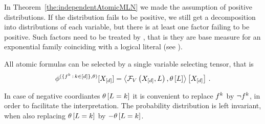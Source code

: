 
In Theorem~\ref{the:independentAtomicMLN} we made the assumption of positive distributions.
If the distribution fails to be positive, we still get a decomposition into distributions of each variable, but there is at least one factor failing to be positive.
Such factors need to be treated by \HybridLogicNetworks{}, that is they are base measure for an exponential family coinciding with a logical literal (see ).

All atomic formulas can be selected by a single variable selecting tensor, that is
\[ \phi^{(\{f^{k} \,:\, k\in[d]\},\theta)}[X_{[d]}]
= \left\langle \mathcal{F}_{V}\left(X_{[d]},L\right),\theta\left[L\right]\right\rangle \left[ X_{[d]} \right] \, .
\]

In case of negative coordiantes $\theta\left[L=k\right]$ it is convenient to replace $f^{k}$ by $\lnot f^{k}$, in order to facilitate the interpretation.
The probability distribution is left invariant, when also replacing $\theta\left[L=k\right]$ by $-\theta\left[L=k\right]$.



\label{sec:boltzmannMachines}

